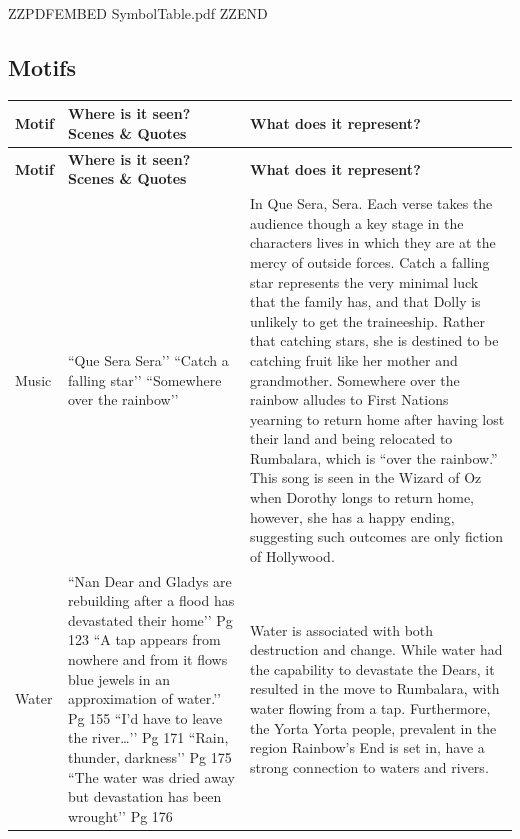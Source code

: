 \documentclass[a4paper]{article}
\begin{document}
ZZPDFEMBED SymbolTable.pdf ZZEND


\newpage

\subsection{Motifs}


\renewcommand{\arraystretch}{1}

\begin{longtable}{|p{2cm}|p{4cm}|p{7cm}|}
\hline
\textbf{Motif} & \textbf{Where is it seen? Scenes \& Quotes} & \textbf{What does it represent?} \\
\hline
\endfirsthead

\hline
\textbf{Motif} & \textbf{Where is it seen? Scenes \& Quotes} & \textbf{What does it represent?} \\
\hline
\endhead

Music & 
``Que Sera Sera’’ \newline
``Catch a falling star’’ \newline
``Somewhere over the rainbow’’ &
In Que Sera, Sera. Each verse takes the audience though a key stage in the characters lives in which they are at the mercy of outside forces. Catch a falling star represents the very minimal luck that the family has, and that Dolly is unlikely to get the traineeship. Rather that catching stars, she is destined to be catching fruit like her mother and grandmother. Somewhere over the rainbow alludes to First Nations yearning to return home after having lost their land and being relocated to Rumbalara, which is “over the rainbow.” This song is seen in the Wizard of Oz when Dorothy longs to return home, however, she has a happy ending, suggesting such outcomes are only fiction of Hollywood. \\
\hline

Water & 
``Nan Dear and Gladys are rebuilding after a flood has devastated their home’’ Pg 123 \newline
``A tap appears from nowhere and from it flows blue jewels in an approximation of water.’’ Pg 155 \newline
``I’d have to leave the river…’’ Pg 171 \newline
``Rain, thunder, darkness’’ Pg 175 \newline
``The water was dried away but devastation has been wrought’’ Pg 176 &
Water is associated with both destruction and change. While water had the capability to devastate the Dears, it resulted in the move to Rumbalara, with water flowing from a tap. Furthermore, the Yorta Yorta people, prevalent in the region Rainbow’s End is set in, have a strong connection to waters and rivers. \\
\hline


\end{longtable}
\end{document}

